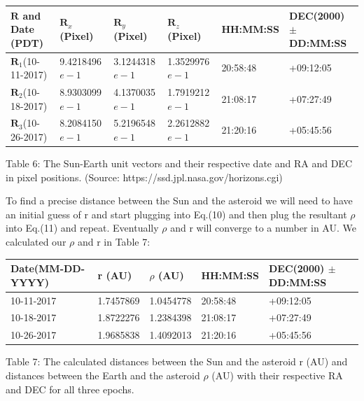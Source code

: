 \documentclass[onecolumn, 12pt, a4paper]{article}
\begin{document}
\hspace*{-1.2cm}\begin{tabular}{ |p{2.5cm}|p{2.5cm}|p{2.5cm}|p{2.5cm}|p{2.3cm}|p{2.5cm}|}

 \hline
  $\textbf{R}$ and Date (PDT)& $\textbf{R}_x$(Pixel) & $\textbf{R}_y$(Pixel) & $\textbf{R}_z$(Pixel) & HH:MM:SS & DEC(2000) $\pm$DD:MM:SS\\
 \hline
 $\textbf{R}_1$(10-11-2017) & 9.4218496$e-1$ & 3.1244318$e-1$ & 1.3529976$e-1$ & 20:58:48 & +09:12:05\\
 \hline
 $\textbf{R}_2$(10-18-2017)& 8.9303099$e-1$ &  4.1370035$e-1$  & 1.7919212$e-1$ & 21:08:17 & +07:27:49 \\
 \hline
 $\textbf{R}_3$(10-26-2017)& 8.2084150$e-1$ & 5.2196548$e-1$ & 2.2612882$e-1$ & 21:20:16 & +05:45:56 \\
 \hline
\end{tabular}
\leavevmode
\newline
\newline

Table 6: The Sun-Earth unit vectors and their respective date and RA and DEC in pixel positions. (Source: https://ssd.jpl.nasa.gov/horizons.cgi)
\newline

To find a precise distance between the Sun and the asteroid we will need to have an initial guess of r and start plugging into Eq.(10) and then plug the resultant $\rho$ into Eq.(11) and repeat. Eventually $\rho$ and r will converge to a number in AU. We calculated our $\rho$ and r in Table 7:\newline

\hspace*{.5cm}\begin{tabular}{ |p{2.5cm}|p{2.5cm}|p{2.5cm}|p{2.3cm}|p{2.3cm}|}

 \hline
  Date(MM-DD-YYYY)& r (AU) & $\rho$ (AU) & HH:MM:SS & DEC(2000) $\pm$DD:MM:SS\\
 \hline
 10-11-2017 & 1.7457869 & 1.0454778 & 20:58:48 & +09:12:05\\
 \hline
 10-18-2017 & 1.8722276 & 1.2384398 & 21:08:17 & +07:27:49 \\
 \hline
 10-26-2017 & 1.9685838 & 1.4092013 & 21:20:16 & +05:45:56 \\
 \hline
\end{tabular}
\newline
\newline

Table 7: The calculated distances between the Sun and the asteroid r (AU) and distances between the Earth and the asteroid $\rho$ (AU) with their respective RA and DEC for all three epochs. \newline
\end{document}
